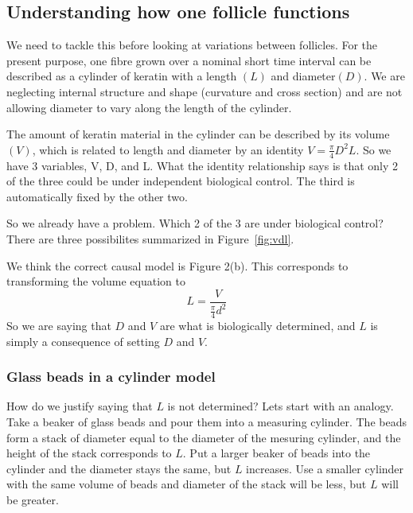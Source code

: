 \documentclass[titlepage]{article}  %
\begin{document}
\subsection{Understanding how one follicle functions}
We need to tackle this before looking at variations between follicles. For the present purpose, one fibre grown over a nominal short time interval can be described as a cylinder of keratin with a length $(L)$ and diameter$(D)$. We are neglecting internal structure and shape (curvature and cross section) and are not allowing diameter to vary along the length of the cylinder. 

The amount of keratin material in the cylinder can be described by its volume $(V)$, which is related to length and diameter by an identity $V = \frac{\pi}{4} D^{2} L$. So we have 3 variables, V, D, and L. What the identity relationship says is that only 2 of the three could be under independent biological control.  The third is automatically fixed by the other two. 

So we already have a problem. Which 2 of the 3 are under biological control?  There are three possibilites summarized in Figure~\ref{fig:vdl}.

We think the correct causal model is Figure 2(b). This corresponds to transforming the volume equation to
\begin{displaymath}
L = \frac{V}{\frac{\pi}{4} d^{2}}
\end{displaymath}
So we are saying that $D$ and $V$ are what is biologically determined, and $L$ is simply a consequence of setting $D$ and $V$. 

\subsubsection{Glass beads in a cylinder model}
How do we justify saying that $L$ is not determined? Lets start with an analogy. Take a beaker of glass beads and pour them into a measuring cylinder. The beads form a stack of diameter equal to the diameter of the mesuring cylinder, and the height of the stack corresponds to $L$. Put a larger beaker of beads into the cylinder and the diameter stays the same, but $L$ increases. Use a smaller cylinder with the same volume of beads and diameter of the stack will be less, but $L$ will be greater. 
\end{document}
